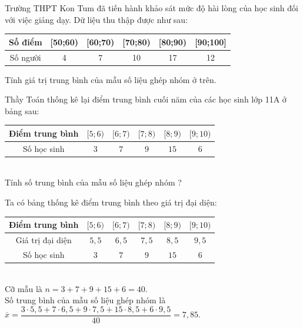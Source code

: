 \begin{bt}%
	Trường THPT Kon Tum đã tiến hành khảo sát mức độ hài lòng của học sinh đối với việc giảng dạy. Dữ liệu thu thập được như sau:
	\begin{center}
		\begin{tabular}{|c|c|c|c|c|c|}
			\hline
			Số điểm &  [50;60) & [60;70) & [70;80) & [80;90) & [90;100]  \\
			\hline
			Số người & 4 & 7 & 10 & 17 & 12 \\
			\hline
		\end{tabular}
	\end{center}
	Tính giá trị trung bình của mẫu số liệu ghép nhóm ở trên.
\end{bt}

\begin{bt}%
	Thầy Toán thống kê lại điểm trung bình cuối năm của các học sinh lớp 11A ở bảng sau:\\
	\begin{tabular}{|c|c|c|c|c| c|}
		\hline
		Điểm trung bình & $[5;6)$  & $[6;7)$  & $[7;8)$ & $[8;9)$  & $[9;10)$  \\
		\hline
		Số học sinh & $3$  & $7$ & $9$ & $15$ & $6$   \\
		\hline
	\end{tabular}\\
	Tính số trung bình của mẫu số liệu ghép nhóm ?
	\loigiai
	{
		Ta có bảng thống kê điểm trung bình theo giá trị đại diện:\\
		\begin{tabular}{|c|c|c|c|c| c|}
			\hline
			Điểm trung bình & $[5;6)$  & $[6;7)$  & $[7;8)$ & $[8;9)$  & $[9;10)$  \\
			\hline
			Giá trị đại diện & $5{,}5$  & $6{,}5$  & $7{,}5$  & $8{,}5$  & $9{,}5$     \\
			\hline
			Số học sinh & $3$  & $7$ & $9$ & $15$ & $6$   \\
			\hline
		\end{tabular}\\
		Cỡ mẫu là $n = 3 + 7 + 9 + 15 + 6 = 40$. \\
		Số trung bình của mẫu số liệu ghép nhóm là\\
		$\overline x  = \dfrac{{3\cdot 5{,}5 + 7\cdot 6{,}5 + 9\cdot 7{,}5 + 15\cdot 8{,}5 + 6\cdot 9{,}5}}{{40}} = 7{,}85$. 
		
	}
\end{bt}

